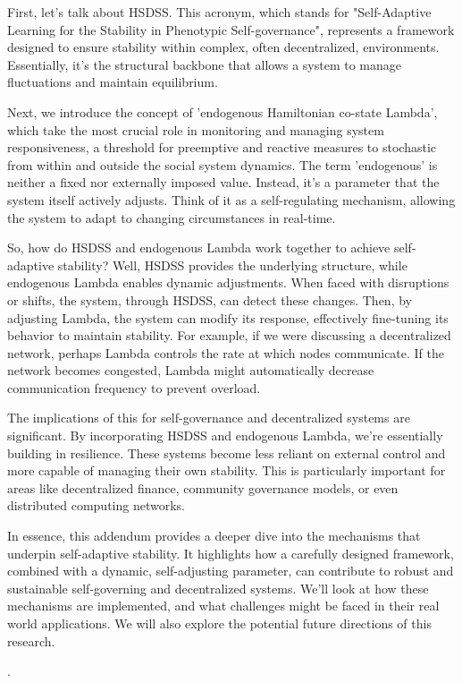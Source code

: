 \documentclass[10pt]{article}
\theoremstyle{definition}
\begin{document}
First, let's talk about HSDSS. This acronym, which stands for "Self-Adaptive Learning for the Stability in Phenotypic Self-governance", represents a framework designed to ensure stability within complex, often decentralized, environments. Essentially, it's the structural backbone that allows a system to manage fluctuations and maintain equilibrium.

Next, we introduce the concept of 'endogenous Hamiltonian co-state Lambda', which take the most crucial role in monitoring and managing system responsiveness, a threshold for preemptive and reactive measures to stochastic from within and outside the social system dynamics. The term 'endogenous' is neither a fixed nor externally imposed value. Instead, it's a parameter that the system itself actively adjusts. Think of it as a self-regulating mechanism, allowing the system to adapt to changing circumstances in real-time.

So, how do HSDSS and endogenous Lambda work together to achieve self-adaptive stability? Well, HSDSS provides the underlying structure, while endogenous Lambda enables dynamic adjustments. When faced with disruptions or shifts, the system, through HSDSS, can detect these changes. Then, by adjusting Lambda, the system can modify its response, effectively fine-tuning its behavior to maintain stability. For example, if we were discussing a decentralized network, perhaps Lambda controls the rate at which nodes communicate. If the network becomes congested, Lambda might automatically decrease communication frequency to prevent overload.

The implications of this for self-governance and decentralized systems are significant. By incorporating HSDSS and endogenous Lambda, we're essentially building in resilience. These systems become less reliant on external control and more capable of managing their own stability. This is particularly important for areas like decentralized finance, community governance models, or even distributed computing networks.

In essence, this addendum provides a deeper dive into the mechanisms that underpin self-adaptive stability. It highlights how a carefully designed framework, combined with a dynamic, self-adjusting parameter, can contribute to robust and sustainable self-governing and decentralized systems. We’ll look at how these mechanisms are implemented, and what challenges might be faced in their real world applications. We will also explore the potential future directions of this research.

.
\end{document}
